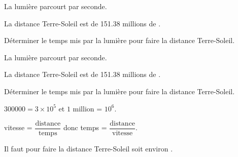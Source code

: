 \begin{exercice*}
    La lumière parcourt  par seconde.

    La distance Terre-Soleil est de \num{151.38} millions de \Lg[km]{}.

    \medskip
    Déterminer le temps mis par la lumière pour faire la distance Terre-Soleil.
    
\end{exercice*}
\begin{corrige}
    La lumière parcourt  par seconde.

    La distance Terre-Soleil est de \num{151.38} millions de \Lg[km]{}.

    \medskip
    Déterminer le temps mis par la lumière pour faire la distance Terre-Soleil.

    {\red $\num{300000}=3\times 10^5$ et $1$ million = $10^6$. 
    
    vitesse = $\dfrac{\text{distance}}{\text{temps}}$ donc temps = $\dfrac{\text{distance}}{\text{vitesse}}$.

    Il faut  pour faire la distance Terre-Soleil soit environ .
    }
\end{corrige}


